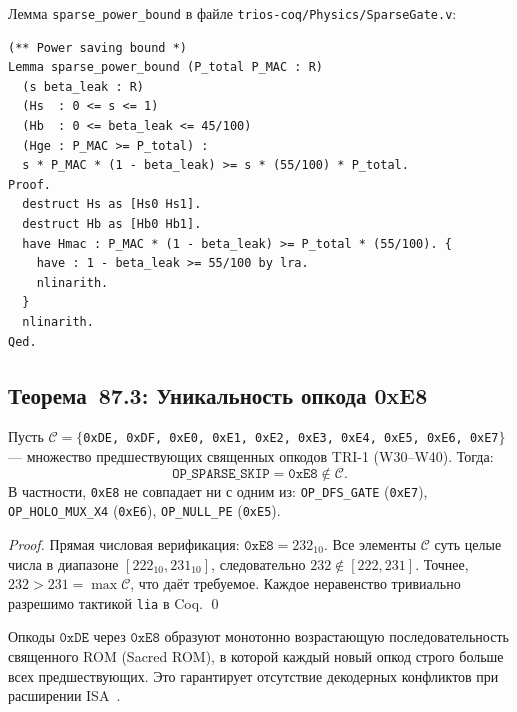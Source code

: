 \begin{remark}
Лемма \texttt{sparse\_power\_bound} в файле
\texttt{trios-coq/Physics/SparseGate.v}:
\begin{lstlisting}[language=Coq,
  caption={sparse\_power\_bound — Coq-лемма о границе экономии мощности},
  label={lst:coq-power}]
(** Power saving bound *)
Lemma sparse_power_bound (P_total P_MAC : R)
  (s beta_leak : R)
  (Hs  : 0 <= s <= 1)
  (Hb  : 0 <= beta_leak <= 45/100)
  (Hge : P_MAC >= P_total) :
  s * P_MAC * (1 - beta_leak) >= s * (55/100) * P_total.
Proof.
  destruct Hs as [Hs0 Hs1].
  destruct Hb as [Hb0 Hb1].
  have Hmac : P_MAC * (1 - beta_leak) >= P_total * (55/100). {
    have : 1 - beta_leak >= 55/100 by lra.
    nlinarith.
  }
  nlinarith.
Qed.
\end{lstlisting}
\end{remark}


\subsection{Теорема~87.3: Уникальность опкода 0xE8}
\label{ssec:thm87-3}

\begin{theorem}
\label{thm:opcode-unique}
Пусть $\mathcal{C} = \{$\texttt{0xDE, 0xDF, 0xE0, 0xE1, 0xE2, 0xE3,
0xE4, 0xE5, 0xE6, 0xE7}$\}$ — множество предшествующих священных
опкодов TRI-1 (W30–W40).  Тогда:
\[
  \texttt{OP\_SPARSE\_SKIP} = \texttt{0xE8} \notin \mathcal{C}.
\]
В частности, \texttt{0xE8} не совпадает ни с одним из:
\texttt{OP\_DFS\_GATE} (\texttt{0xE7}),
\texttt{OP\_HOLO\_MUX\_X4} (\texttt{0xE6}),
\texttt{OP\_NULL\_PE} (\texttt{0xE5}).
\end{theorem}

\begin{proof}
Прямая числовая верификация: $\texttt{0xE8} = 232_{10}$.
Все элементы $\mathcal{C}$ суть целые числа в диапазоне
$[222_{10}, 231_{10}]$, следовательно $232 \notin [222, 231]$.
Точнее, $232 > 231 = \max \mathcal{C}$, что даёт требуемое.
Каждое неравенство тривиально разрешимо тактикой \texttt{lia}
в Coq.
\qed
\end{proof}

\begin{corollary}
\label{cor:sacred-rom}
Опкоды $\texttt{0xDE}$ через $\texttt{0xE8}$ образуют монотонно
возрастающую последовательность священного ROM (Sacred ROM), в которой
каждый новый опкод строго больше всех предшествующих.
Это гарантирует отсутствие декодерных конфликтов при расширении ISA~\cite{Hennessy-Patterson-CA6}.
\end{corollary}

